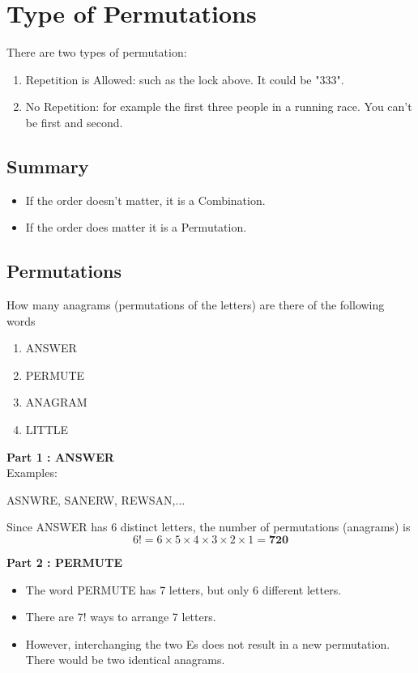 \documentclass[12pt]{report}
\begin{document}
	\section*{Type of Permutations}
		There are two types of permutation:
		\begin{enumerate}
			\item Repetition is Allowed: such as the lock above. It could be "333".
			\item No Repetition: for example the first three people in a running race. You can't be first and second.
		\end{enumerate}
		
		\subsection*{Summary}
		\begin{itemize}
			\item If the order doesn't matter, it is a Combination.
			\item If the order does matter it is a Permutation.
		\end{itemize}
		
		\subsection{Permutations}
	
		How many anagrams (permutations of the letters) are there of the following words
		\begin{enumerate}
			\item ANSWER
			\item PERMUTE
			\item ANAGRAM
			\item LITTLE
		\end{enumerate}
		
		
		\textbf{Part 1 : ANSWER}\\
		Examples:
		\begin{center}
			ASNWRE,\;
			SANERW,\;
			REWSAN,\;...
		\end{center}
		
		Since ANSWER has 6 distinct letters, the number of permutations (anagrams) is
		\LARGE
		\[6! = 6\times 5 \times 4 \times 3 \times 2\times 1 = \boldsymbol{720} \]
		
		\vspace{-0.3cm}
		\textbf{Part 2 : PERMUTE}\\
		\begin{itemize}
			\item The word PERMUTE has 7 letters, but only 6 different letters. 
			\item There are 7! ways to arrange 7 letters.
			\item However, interchanging the two Es does not result in a new permutation. There would be two identical anagrams.
		\end{itemize}
		
\end{document}
